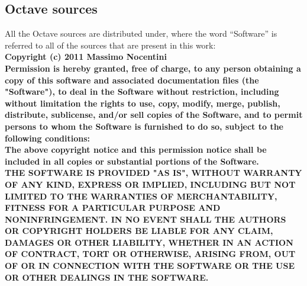 \subsection*{Octave sources}
All the Octave sources are distributed under, where the word ``Software'' is
referred to all of the sources that are present in this work: \\
\textbf{
Copyright (c) 2011 Massimo Nocentini\\
Permission is hereby granted, free of charge, to any person obtaining a copy of
this software and associated documentation files (the "Software"), to deal in 
the Software without restriction, including without limitation the rights to 
use, copy, modify, merge, publish, distribute, sublicense, and/or sell 
copies of the Software, and to permit persons to whom the Software is furnished 
to do so, subject to the following conditions:\\
The above copyright notice and this permission notice shall be included in all 
copies or substantial portions of the Software.\\
THE SOFTWARE IS PROVIDED "AS IS", WITHOUT WARRANTY OF ANY KIND, EXPRESS OR 
IMPLIED, INCLUDING BUT NOT LIMITED TO THE WARRANTIES OF MERCHANTABILITY, 
FITNESS FOR A PARTICULAR PURPOSE AND NONINFRINGEMENT. IN NO EVENT SHALL THE 
AUTHORS OR COPYRIGHT HOLDERS BE LIABLE FOR ANY CLAIM, DAMAGES OR OTHER LIABILITY, 
WHETHER IN AN ACTION OF CONTRACT, TORT OR OTHERWISE, ARISING FROM, OUT OF OR IN 
CONNECTION WITH THE SOFTWARE OR THE USE OR OTHER DEALINGS IN THE SOFTWARE.
}